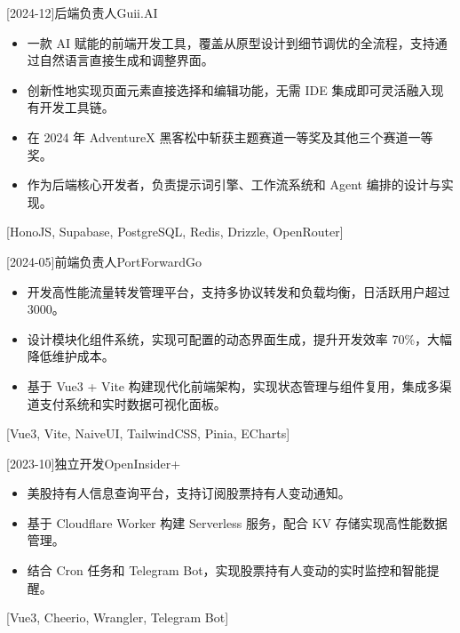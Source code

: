 \documentclass[zh]{resume}
\begin{document}
\begin{projects}
  [2024-12]{后端负责人}{}{Guii.AI}{
    \begin{itemize}
      \item 一款 AI 赋能的前端开发工具，覆盖从原型设计到细节调优的全流程，支持通过自然语言直接生成和调整界面。
      \item 创新性地实现页面元素直接选择和编辑功能，无需 IDE 集成即可灵活融入现有开发工具链。
      \item 在 2024 年 AdventureX 黑客松中斩获主题赛道一等奖及其他三个赛道一等奖。
      \item 作为后端核心开发者，负责提示词引擎、工作流系统和 Agent 编排的设计与实现。
    \end{itemize}
  }[HonoJS, Supabase, PostgreSQL, Redis, Drizzle, OpenRouter]

  \separator{0.5ex}
  [2024-05]{前端负责人}{}{PortForwardGo}{
    \begin{itemize}
      \item 开发高性能流量转发管理平台，支持多协议转发和负载均衡，日活跃用户超过 3000。
      \item 设计模块化组件系统，实现可配置的动态界面生成，提升开发效率 70\%，大幅降低维护成本。
      \item 基于 Vue3 + Vite 构建现代化前端架构，实现状态管理与组件复用，集成多渠道支付系统和实时数据可视化面板。
    \end{itemize}
  }[Vue3, Vite, NaiveUI, TailwindCSS, Pinia, ECharts]

  \separator{0.5ex}
  [2023-10]{独立开发}{}{OpenInsider+}{
    \begin{itemize}
      \item 美股持有人信息查询平台，支持订阅股票持有人变动通知。
      \item 基于 Cloudflare Worker 构建 Serverless 服务，配合 KV 存储实现高性能数据管理。
      \item 结合 Cron 任务和 Telegram Bot，实现股票持有人变动的实时监控和智能提醒。
    \end{itemize}
  }[Vue3, Cheerio, Wrangler, Telegram Bot]
\end{projects}
\end{document}
